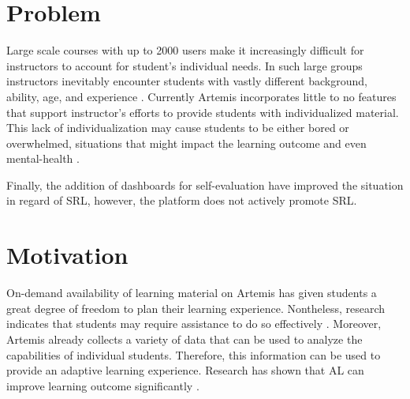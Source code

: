 \documentclass[a4paper,12pt,twoside]{article}
\begin{document}
\section{Problem}

Large scale courses with up to 2000 users make it increasingly difficult for instructors to account for student's individual needs. In such large groups
instructors inevitably encounter students with vastly different background, ability, age, and experience \cite{mulryan2010teaching}. Currently Artemis
incorporates little to no features that support instructor's efforts to provide students with individualized material. This lack of individualization
may cause students to be either bored or overwhelmed, situations that might impact the learning outcome and even mental-health \cite{graciani2020m, kadison2004college}.

Finally, the addition of dashboards for self-evaluation have improved the situation in regard of \ac{SRL}, however, the platform does not actively promote
\ac{SRL}.


\section{Motivation}

On-demand availability of learning material on Artemis has given students a great degree of freedom to plan their learning experience. Nontheless, research
indicates that students may require assistance to do so effectively \cite{latham1991self}. Moreover, Artemis already collects a variety of data that can be used to analyze
the capabilities of individual students. Therefore, this information can be used to provide an adaptive learning experience. Research has shown that
\ac{AL} can improve learning outcome significantly \cite{liu2017investigating}.
\end{document}
